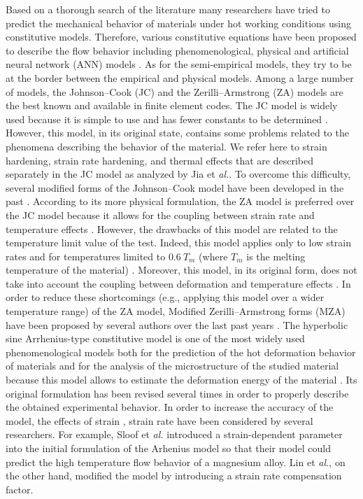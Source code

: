 \documentclass[twoside,english,1p,final,sort&compress]{elsarticle}
\makeatletter
\theoremstyle{plain}
\newcommand*{\eal}{et \emph{al.}\@\xspace}
\newcommand*{\eg}{e.g.,\@\xspace}
\makeatother
\begin{document}
Based on a thorough search of the literature many researchers have tried to predict the mechanical behavior of materials under hot working conditions using constitutive models. Therefore, various constitutive equations have been proposed to describe the flow behavior including phenomenological, physical and artiﬁcial neural network (ANN) models \cite{Lin-2011,Shin-2010,Rusinek-2010}. As for the semi-empirical models, they try to be at the border between the empirical and physical models. Among a large number of models, the Johnson--Cook (JC) \cite{Johnson-1983, Johnson-1985} and the Zerilli--Armstrong (ZA) \cite{Zerilli-1987} models are the best known and available in finite element codes. The JC model is widely used because it is simple to use and has fewer constants to be determined \cite{Khan-2004, NematNasser-2003}. However, this model, in its original state, contains some problems related to the phenomena describing the behavior of the material. We refer here to strain hardening, strain rate hardening, and thermal effects that are described separately in the JC model as analyzed by Jia \eal \cite{Jia-2021}. To overcome this difficulty, several modified forms of the Johnson--Cook model have been developed in the past \cite{Rule-1998, Vural-2003, Lin-2010, Lin-2012, Li-2013, Zhou-2019, Zhang-2015}. According to its more physical formulation, the ZA model is preferred over the JC model because it allows for the coupling between strain rate and temperature effects \cite{Johnson-1988, Voyiadjis-2005, Dey-2007}. However, the drawbacks of this model are related to the temperature limit value of the test. Indeed, this model applies only to low strain rates and for temperatures limited to $0.6~T_m$ (where $T_m$ is the melting temperature of the material) \cite{Chiou-2005, Lee-2005, Chen-2007, Lee-2006}. Moreover, this model, in its original form, does not take into account the coupling between deformation and temperature effects \cite{Samantaray-2009}. In order to reduce these shortcomings (\eg applying this model over a wider temperature range) of the ZA model, Modified Zerilli--Armstrong forms (MZA) have been proposed by several authors over the last past years \cite{NematNasser-2004, Lennon-2004, Muralli-2017, Cheng-2021, Muralli-2021}.
The hyperbolic sine Arrhenius-type constitutive model is one of the most widely used phenomenological models both for the prediction of the hot deformation behavior of materials and for the analysis of the microstructure of the studied material because   this model allows to estimate the deformation energy of the material \cite{Jonas-1969,Zhang-2012,Mostafaei-2012}. Its original formulation has been revised several times in order to properly describe the obtained experimental behavior. In order to increase the accuracy of the model, the effects of strain \cite{Slooff-2007, Li-2012, Xu-2013}, strain rate \cite{Lin-2008-C, Mandal-2009} have been considered by several researchers. For example, Sloof \eal \cite{Slooff-2007} introduced a strain-dependent parameter into the initial formulation of the Arhenius model so that their model could predict the high temperature flow behavior of a magnesium alloy. Lin \eal \cite{Lin-2008-C}, on the other hand, modified the model by introducing a strain rate compensation factor.
\end{document}
